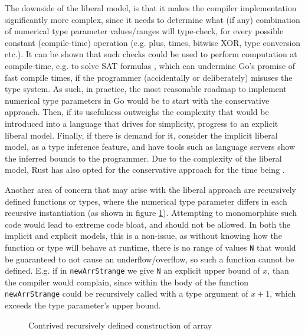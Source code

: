 The downside of the liberal model, is that it makes the compiler implementation
significantly more complex, since it needs to determine what (if any)
combination of numerical type parameter values/ranges will type-check, for every
possible constant (compile-time) operation (e.g. plus, times, bitwise XOR, type
conversion etc.).
It can be shown that such checks could be used to perform computation at
compile-time, e.g. to solve SAT formulas \autocite{goArraySAT}, which can
undermine Go's promise of fast compile times, if the programmer (accidentally or
deliberately) misuses the type system. As such, in practice, the most reasonable
roadmap to implement numerical type parameters in Go would be to start with the
conservative approach. Then, if its usefulness outweighs the complexity that
would be introduced into a language that drives for simplicity, progress to an
explicit liberal model. Finally, if there is demand for it, consider the
implicit liberal model, as a type inference feature, and have tools such as
language servers show the inferred bounds to the programmer. Due to the
complexity of the liberal model, Rust has also opted for the conservative
approach for the time being \autocite{rustConstBlog}.

Another area of concern that may arise with the liberal approach are recursively
defined functions or types, where the numerical type parameter differs in each
recursive instantiation (as shown in figure \ref{fig:strange-arr-init}).
Attempting to monomorphise such code would lead to extreme code bloat, and
should not be allowed. In both the implicit and explicit models, this is a
non-issue, as without knowing how the function or type will behave at runtime,
there is no range of values \texttt{N} that would be guaranteed to not cause an
underflow/overflow, so such a function cannot be defined. E.g. if in
\texttt{newArrStrange} we give \texttt{N} an explicit upper bound of $x$, than
the compiler would complain, since within the body of the function
\texttt{newArrStrange} could be recursively called with a type argument of $x +
    1$, which exceeds the type parameter's upper bound.

\begin{figure}
    \caption{Contrived recursively defined construction of array}
    \label{fig:strange-arr-init}
\end{figure}

